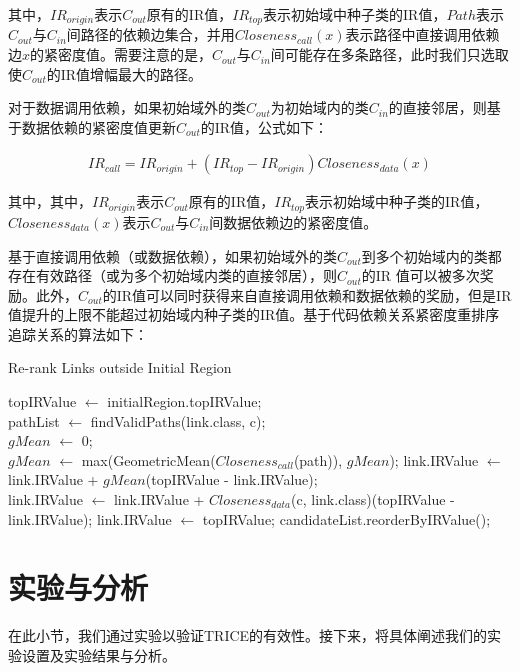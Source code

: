 其中，$IR_{origin}$表示$C_{out}$原有的IR值，$IR_{top}$表示初始域中种子类的IR值，$Path$表示$C_{out}$与$C_{in}$间路径的依赖边集合，并用$Closeness_{call}(x)$表示路径中直接调用依赖边$x$的紧密度值。需要注意的是，$C_{out}$与$C_{in}$间可能存在多条路径，此时我们只选取使$C_{out}$的IR值增幅最大的路径。

对于数据调用依赖，如果初始域外的类$C_{out}$为初始域内的类$C_{in}$的直接邻居，则基于数据依赖的紧密度值更新$C_{out}$的IR值，公式如下：

\begin{align}IR_{call}=IR_{origin}+(IR_{top}-IR_{origin})Closeness_{data}(x) \end{align}

其中，其中，$IR_{origin}$表示$C_{out}$原有的IR值，$IR_{top}$表示初始域中种子类的IR值，$Closeness_{data}(x)$表示$C_{out}$与$C_{in}$间数据依赖边的紧密度值。

基于直接调用依赖（或数据依赖），如果初始域外的类$C_{out}$到多个初始域内的类都存在有效路径（或为多个初始域内类的直接邻居），则$C_{out}$的IR
值可以被多次奖励。此外，$C_{out}$的IR值可以同时获得来自直接调用依赖和数据依赖的奖励，但是IR值提升的上限不能超过初始域内种子类的IR值。基于代码依赖关系紧密度重排序追踪关系的算法如下：
\begin{algorithm}[htbp]
\caption{Re-rank Links outside Initial Region}
\label{alg:Re-rankLinksOutsideInitialRegion}
topIRValue $\leftarrow$ initialRegion.topIRValue;\\
 {
	 {
   		 {
        	pathList $\leftarrow$ findValidPaths(link.class, c);\\
          	$gMean$ $\leftarrow$ 0;\\
          	 {
            	$gMean$ $\leftarrow$ max(GeometricMean($Closeness_{call}$(path)), $gMean$);
          	}
          	link.IRValue $\leftarrow$ link.IRValue + $gMean$(topIRValue - link.IRValue);\\
           	 {
            	link.IRValue $\leftarrow$ link.IRValue + $Closeness_{data}$(c, link.class)(topIRValue - link.IRValue);
          	}
      	}
      	 {
       		link.IRValue $\leftarrow$ topIRValue;
        }
    }
}
candidateList.reorderByIRValue();
\end{algorithm}

\section{实验与分析}
在此小节，我们通过实验以验证TRICE的有效性。接下来，将具体阐述我们的实
验设置及实验结果与分析。

